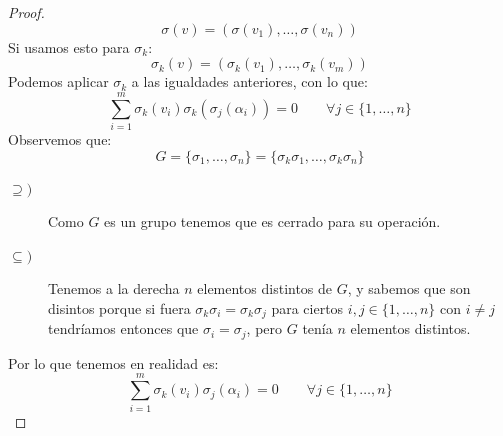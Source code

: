 \begin{prop}[Artin]
\begin{proof}
        \begin{equation*}
            \sigma(v) = (\sigma(v_1), \ldots, \sigma(v_n))
        \end{equation*}
        Si usamos esto para $\sigma_k$:
        \begin{equation*}
            \sigma_k(v) = (\sigma_k(v_1), \ldots, \sigma_k(v_m))
        \end{equation*}
        Podemos aplicar $\sigma_k$ a las igualdades anteriores, con lo que:
        \begin{equation*}
            \sum_{i=1}^m \sigma_k(v_i) \sigma_k(\sigma_j(\alpha_i)) = 0 \qquad \forall j \in \{1,\ldots,n\}
        \end{equation*}
        Observemos que:
        \begin{equation*}
            G = \{\sigma_1, \ldots, \sigma_n\} = \{\sigma_k\sigma_1, \ldots, \sigma_k\sigma_n\}
        \end{equation*}
        \begin{description}
            \item [$\supseteq )$] Como $G$ es un grupo tenemos que es cerrado para su operación.
            \item [$\subseteq )$] Tenemos a la derecha $n$ elementos distintos de $G$, y sabemos que son disintos porque si fuera $\sigma_k\sigma_i = \sigma_k\sigma_j$ para ciertos $i,j\in \{1,\ldots,n\}$ con $i\neq j$ tendríamos entonces que $\sigma_i = \sigma_j$, pero $G$ tenía $n$ elementos distintos.
        \end{description}
        Por lo que tenemos en realidad es:
        \begin{equation*}
            \sum_{i=1}^{m} \sigma_k(v_i)\sigma_j(\alpha_i) = 0 \qquad \forall j \in \{1,\ldots,n\}
        \end{equation*}


\end{proof}
\end{prop}
